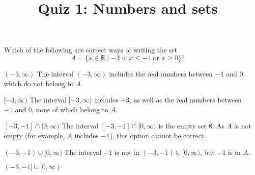\documentclass[pst2pdf]{mathquiz}
\title{Quiz 1: Numbers and sets}
\newcommand{\R}{\mathbb R}
\begin{document}
%
%
%


        \begin{question}
        Which of the following are correct ways of writing the set
        \[ A=\{x \in \mathbb{R} \mid -3 < x \leq -1 \text{ or } x\geq 0\} ?\]
        \begin{choice}
        \incorrect $(-3,\infty)$
        The interval \response $(-3,\infty)$ includes the real numbers between $-1$ and $0$,
        which do not belong to $A$.

        \incorrect $[-3,\infty)$
        \response The interval $[-3,\infty)$ includes $-3$, as well as
        the real numbers between $-1$ and $0$, none of which
         belong to $A$.

        \incorrect $[-3,-1]\cap[0,\infty)$
        \response The interval $[-3,-1]\cap[0,\infty)$ is the empty set $\emptyset$. As $A$ is not empty (for example, $A$ includes $-1$), this option cannot be correct.

        \incorrect $(-3,-1)\cup[0,\infty)$
        \response The interval $-1$ is not in $(-3,-1)\cup[0,\infty)$, but $-1$ is in $A$.

        \correct $(-3,-1]\cup[0,\infty)$

        \end{choice}
\end{question}
\end{document}
